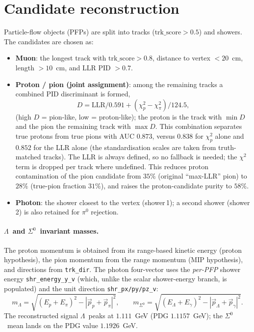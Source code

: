 \documentclass[11pt,a4paper]{article}
\newcommand{\Szero}{\ensuremath{\Sigma^0}}
\newcommand{\Lam}{\ensuremath{\Lambda}}
\begin{document}
\section{Candidate reconstruction}
Particle-flow objects (PFPs) are split into tracks ($\mathrm{trk\_score}>0.5$)
and showers. The candidates are chosen as:
\begin{itemize}
  \item \textbf{Muon}: the longest track with $\mathrm{trk\_score}>0.8$,
        distance to vertex $<20$~cm, length $>10$~cm, and LLR PID $>0.7$.
  \item \textbf{Proton / pion (joint assignment)}: among the remaining tracks a
        combined PID discriminant is formed,
        \[ D = \mathrm{LLR}/0.591 + (\chi^2_{p}-\chi^2_{\pi})/124.5, \]
        (high $D$ = pion-like, low = proton-like); the proton is the track with
        $\min D$ and the pion the remaining track with $\max D$. This combination
        separates true protons from true pions with AUC $0.873$, versus $0.838$
        for $\chi^2_{p}$ alone and $0.852$ for the LLR alone (the standardisation
        scales are taken from truth-matched tracks). The LLR is always defined, so
        no fallback is needed; the $\chi^2$ term is dropped per track where
        undefined. This reduces proton contamination of the pion candidate from
        $35\%$ (original ``max-LLR'' pion) to $28\%$ (true-pion fraction $31\%$),
        and raises the proton-candidate purity to $58\%$.
  \item \textbf{Photon}: the shower closest to the vertex (shower\,1); a second
        shower (shower\,2) is also retained for $\pi^0$ rejection.
\end{itemize}

\paragraph{\Lam\ and \Szero\ invariant masses.}
The proton momentum is obtained from its range-based kinetic energy (proton
hypothesis), the pion momentum from the range momentum (MIP hypothesis), and
directions from \texttt{trk\_dir}. The photon four-vector uses the
\emph{per-PFP} shower energy \texttt{shr\_energy\_y\_v} (which, unlike the scalar
shower-energy branch, is populated) and the unit direction
\texttt{shr\_px/py/pz\_v}:
\[
  m_\Lam = \sqrt{(E_p+E_\pi)^2-|\vec p_p+\vec p_\pi|^2},\qquad
  m_\Szero = \sqrt{(E_\Lam+E_\gamma)^2-|\vec p_\Lam+\vec p_\gamma|^2}.
\]
The reconstructed signal \Lam\ peaks at $1.111$~GeV (PDG $1.1157$~GeV);
the \Szero\ mean lands on the PDG value $1.1926$~GeV.
\end{document}
